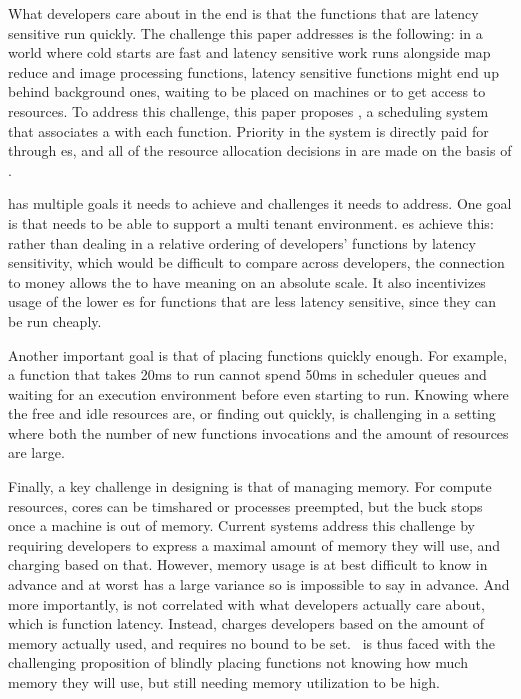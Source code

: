What developers care about in the end is that the functions that are latency
sensitive run quickly. The challenge this paper addresses is the following: in a
world where cold starts are fast and latency sensitive work runs alongside map
reduce and image processing functions, latency sensitive functions might end up
behind background ones, waiting to be placed on machines or to get access to
resources. To address this challenge, this paper proposes \sys{}, a scheduling
system that associates a \textit{\priceclass{}} with each function. Priority
in the system is directly paid for through \priceclass{}es, and all of the
resource allocation decisions in \sys{} are made on the basis of \priceclass{}.

\Sys{} has multiple goals it needs to achieve and challenges it needs to
address. One goal is that \sys{} needs to be able to support a multi tenant
environment. \Priceclass{}es achieve this: rather than dealing in a relative
ordering of developers' functions by latency sensitivity, which would be
difficult to compare across developers, the connection to money allows the
\class{} to have meaning on an absolute scale. It also incentivizes usage of the
lower \class{}es for functions that are less latency sensitive, since they can
be run cheaply.


Another important goal is that of placing functions quickly enough. For example,
a function that takes 20ms to run cannot spend 50ms in scheduler queues and
waiting for an execution environment before even starting to run. Knowing where
the free and idle resources are, or finding out quickly, is challenging in a
setting where both the number of new functions invocations and the amount of
resources are large.


Finally, a key challenge in designing \sys{} is that of managing memory. For
compute resources, cores can be timshared or processes preempted, but the buck
stops once a machine is out of memory. Current systems address this challenge by
requiring developers to express a maximal amount of memory they will use, and
charging based on that. However, memory usage is at best difficult to know in
advance and at worst has a large variance so is impossible to say in advance.
And more importantly, is not correlated with what developers actually care
about, which is function latency. Instead, \sys{} charges developers based on
the amount of memory actually used, and requires no bound to be set.~\Sys{} is
thus faced with the challenging proposition of blindly placing functions not
knowing how much memory they will use, but still needing memory utilization to
be high.
 
